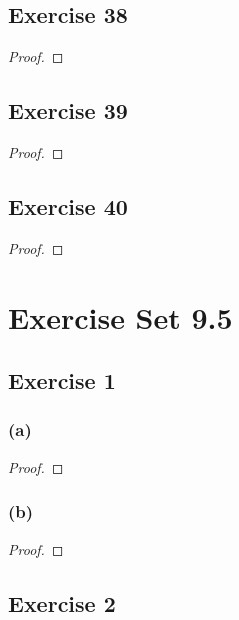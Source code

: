 \documentclass[14pt]{extarticle}
\begin{document}
\subsection{Exercise 38}

\begin{proof}

\end{proof}

\subsection{Exercise 39}

\begin{proof}

\end{proof}

\subsection{Exercise 40}

\begin{proof}

\end{proof}

\section{Exercise Set 9.5}

\subsection{Exercise 1}

\subsubsection{(a)}

\begin{proof}

\end{proof}

\subsubsection{(b)}

\begin{proof}

\end{proof}

\subsection{Exercise 2}
\end{document}
